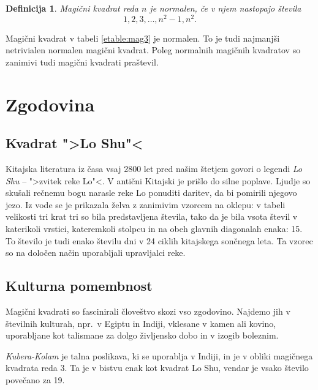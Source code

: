 \documentclass[a4paper,12pt]{article}
\newtheorem{definicija}{Definicija}
\begin{document}
   \begin{definicija}
      Magični kvadrat reda \(n\) je \emph{normalen}, če v njem nastopajo števila
      \begin{equation}
         \label{eq:numbers}
         1, 2, 3, \ldots, n^2-1, n^2.
      \end{equation}
   \end{definicija}
   
Magični kvadrat v tabeli \ref{etable:mag3} je normalen.
To je tudi najmanjši netrivialen normalen magični kvadrat.
Poleg normalnih magičnih kvadratov so zanimivi tudi magični kvadrati praštevil. %


\section{Zgodovina}

\subsection{Kvadrat ">Lo Shu"<}

Kitajska literatura iz časa vsaj 2800 let pred našim štetjem govori o legendi
\emph{Lo Shu} -- ">zvitek reke Lo"<. V antični Kitajski je prišlo do
silne poplave. Ljudje so skušali rečnemu bogu narasle reke Lo ponuditi daritev,
da bi pomirili njegovo jezo. Iz vode se je prikazala želva z zanimivim vzorcem
na oklepu: v tabeli velikosti tri krat tri so bila predstavljena števila, tako
da je bila vsota števil v katerikoli vrstici, kateremkoli stolpcu in na obeh
glavnih diagonalah enaka: 15. To število je tudi enako številu dni v 24 ciklih
kitajskega sončnega leta. Ta vzorec so na določen način uporabljali upravljalci
reke.


\subsection{Kulturna pomembnost}

Magični kvadrati so fascinirali človeštvo skozi vso zgodovino. Najdemo jih
v številnih kulturah, npr.\ v Egiptu in Indiji, vklesane v kamen ali
kovino, uporabljane kot talismane za dolgo življensko dobo in v
izogib boleznim.

\emph{Kubera-Kolam} je talna poslikava, ki se uporablja v Indiji, in je v
obliki magičnega kvadrata reda 3. Ta je v bistvu enak kot kvadrat
Lo Shu, vendar je vsako število povečano za 19.
\end{document}
